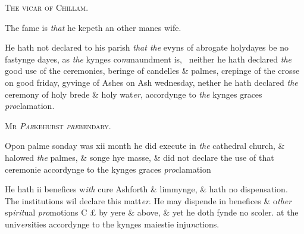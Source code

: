 \documentclass[12pt, a4paper]{book}
\begin{document}
	
				\begin{center} \begin{large} {\scshape The vicar of Chillam.} \end{large} \end{center}
			

 
			
		\ifthenelse{\isodd{\thepage}}
		{\reversemarginpar}
		{\normalmarginpar}
		The fame is \textit{that} he kepeth an other manes wife.
 
		\ifthenelse{\isodd{\thepage}}
		{\reversemarginpar}
		{\normalmarginpar}
		He hath not declared to his parish \textit{that the} evyns of abrogate
 holydayes be no fastynge dayes, as \textit{the} kynges co\textit{m}maundment is, 
 neither he hath declared \textit{the} good use of the ceremonies, beringe
 of candelles \& palmes, crepinge of the crosse on good friday,
 gyvinge of Ashes on Ash wednesday, nether he hath declared \textit{the} ceremony of holy brede \& holy wat\textit{er}, accordynge to
 \textit{the} kynges graces \textit{pro}clamation.
 

            
            	
				\begin{center} \begin{large} {\scshape Mr \textit{Par}kehurst \textit{pre}bendary.} \end{large} \end{center}
			

 
				\marginpar[\vspace{0.5cm}{\textcolor{Gray}{ceremonies}}]{}
			
		\ifthenelse{\isodd{\thepage}}
		{\reversemarginpar}
		{\normalmarginpar}
		Opon palme sonday was xii month he did execute in \textit{the}
 cathedral church, \& halowed \textit{the} palmes, \& songe hye masse,
 \& did not declare the use of that ceremonie accordynge to
 the kynges graces \textit{pro}clamation
            	
				\marginpar[\vspace{0.5cm}{\textcolor{Gray}{n}}]{}
			
		\ifthenelse{\isodd{\thepage}}
		{\reversemarginpar}
		{\normalmarginpar}
		He hath ii benefices w\textit{ith} cure Ashforth \& limmynge, \& hath no
 dispensation. The institutions wil declare this matt\textit{er}.
 He may dispende in benefices \& o\textit{ther} sp\textit{irit}ual\textit{ pro}motions C £ by
 yere \& above, \& yet he doth fynde no scoler. at the univ\textit{er}sities accordynge to the kynges maiestie inju\textit{n}ctions.
  
\end{document}
